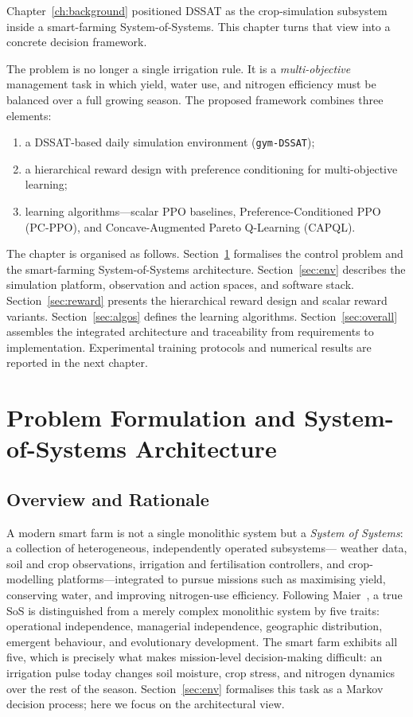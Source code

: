 Chapter~\ref{ch:background} positioned DSSAT as the crop-simulation subsystem
inside a smart-farming System-of-Systems. This chapter turns that view into a
concrete decision framework.

The problem is no longer a single irrigation rule. It is a \emph{multi-objective}
management task in which yield, water use, and nitrogen efficiency must be
balanced over a full growing season. The proposed framework combines three
elements:
\begin{enumerate}
  \item a DSSAT-based daily simulation environment (\texttt{gym-DSSAT});
  \item a hierarchical reward design with preference conditioning for
        multi-objective learning;
  \item learning algorithms---scalar PPO baselines, Preference-Conditioned PPO
        (PC-PPO), and Concave-Augmented Pareto Q-Learning (CAPQL).
\end{enumerate}

The chapter is organised as follows. Section~\ref{sec:sos} formalises the
control problem and the smart-farming System-of-Systems architecture.
Section~\ref{sec:env} describes the simulation platform, observation and action
spaces, and software stack. Section~\ref{sec:reward} presents the hierarchical
reward design and scalar reward variants. Section~\ref{sec:algos} defines the
learning algorithms. Section~\ref{sec:overall} assembles the integrated
architecture and traceability from requirements to implementation. Experimental
training protocols and numerical results are reported in the next chapter.


\section{Problem Formulation and System-of-Systems Architecture}
\label{sec:sos}

\subsection{Overview and Rationale}

A modern smart farm is not a single monolithic system but a \emph{System of
Systems}: a collection of heterogeneous, independently operated subsystems---
weather data, soil and crop observations, irrigation and fertilisation
controllers, and crop-modelling platforms---integrated to pursue missions such
as maximising yield, conserving water, and improving nitrogen-use efficiency.
Following Maier~\cite{maier1998}, a true SoS is distinguished from a merely
complex monolithic system by five traits: operational independence, managerial
independence, geographic distribution, emergent behaviour, and evolutionary
development. The smart farm exhibits all five, which is precisely what makes
mission-level decision-making difficult: an irrigation pulse today changes soil
moisture, crop stress, and nitrogen dynamics over the rest of the season.
Section~\ref{sec:env} formalises this task as a Markov decision process; here
we focus on the architectural view.


